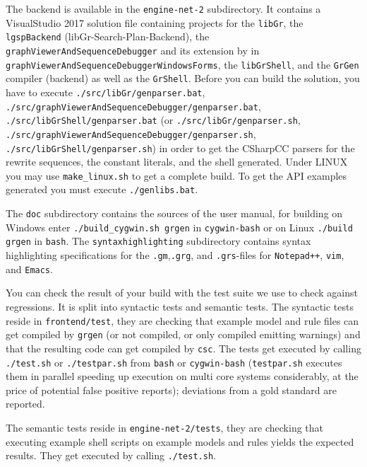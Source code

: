 The backend is available in the \texttt{engine-net-2} subdirectory. 
It contains a VisualStudio 2017 solution file containing projects for the \texttt{libGr}, the \texttt{lgspBackend} (libGr-Search-Plan-Backend), the \texttt{graph\-Viewer\-And\-Sequence\-Debugger} and its extension by \MSAGL{} in \texttt{graph\-Viewer\-And\-Sequence\-Debugger\-Windows\-Forms}, the \texttt{lib\-Gr\-Shell}, and the \texttt{GrGen} compiler (backend) as well as the \texttt{GrShell}.
Before you can build the solution, you have to execute \texttt{./src/lib\-Gr/gen\-parser.bat}, \texttt{./src/graph\-Viewer\-And\-Sequence\-Debugger/gen\-parser.bat}, \texttt{./src/lib\-Gr\-Shell/gen\-parser.bat} (or \texttt{./src/lib\-Gr/gen\-parser.sh}, \texttt{./src/graph\-Viewer\-And\-Sequence\-Debugger/gen\-parser.sh}, \texttt{./src/lib\-Gr\-Shell/gen\-parser.sh}) in order to get the CSharpCC parsers for the rewrite sequences, the constant literals, and the shell generated.
Under LINUX you may use \texttt{make\_linux.sh} to get a complete build.
To get the API examples generated you must execute \texttt{./genlibs.bat}.

\pagebreak

The \texttt{doc} subdirectory contains the sources of the user manual, for building on Windows enter \texttt{./build\_cygwin.sh grgen} in \texttt{cygwin-bash} or on Linux \texttt{./build grgen} in \texttt{bash}.
The \texttt{syntaxhighlighting} subdirectory contains syntax highlighting specifications for the \texttt{.gm},\texttt{.grg}, and \texttt{.grs}-files for \texttt{Notepad++}, \texttt{vim}, and \texttt{Emacs}.

You can check the result of your build with the test suite we use to check against regressions.
It is split into syntactic tests and semantic tests. 
The syntactic tests reside in \texttt{frontend/test}, they are checking that example model and rule files can get compiled by \texttt{grgen} (or not compiled, or only compiled emitting warnings) and that the resulting code can get compiled by \texttt{csc}.
The tests get executed by calling \texttt{./test.sh} or \texttt{./testpar.sh} from \texttt{bash} or \texttt{cygwin-bash} (\texttt{testpar.sh} executes them in parallel speeding up execution on multi core systems considerably, at the price of potential false positive reports); deviations from a gold standard are reported.

The semantic tests reside in \texttt{engine-net-2/tests}, they are checking that executing example shell scripts on example models and rules yields the expected results. 
They get executed by calling \texttt{./test.sh}.


